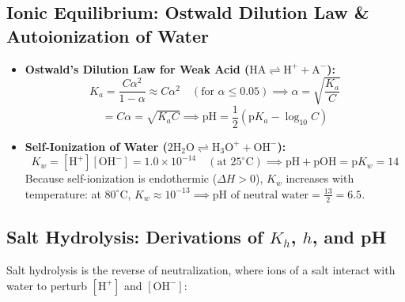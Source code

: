 \documentclass[10pt,a4paper]{article}
\begin{document}
\subsection{Ionic Equilibrium: Ostwald Dilution Law \& Autoionization of Water}
\begin{itemize}
  \item \textbf{Ostwald's Dilution Law for Weak Acid ($\mathrm{HA \rightleftharpoons H^+ + A^-}$):}
  \begin{equation}
    K_a = \frac{C\alpha^2}{1 - \alpha} \approx C\alpha^2 \quad (\text{for } \alpha \le 0.05) \implies \alpha = \sqrt{\frac{K_a}{C}}
  \end{equation}
  \begin{equation}
    [\mathrm{H}^+] = C\alpha = \sqrt{K_a C} \implies \text{pH} = \frac{1}{2}\left(\text{p}K_a - \log_{10} C\right)
  \end{equation}
  \item \textbf{Self-Ionization of Water ($\mathrm{2H_2O \rightleftharpoons H_3O^+ + OH^-}$):}
  \begin{equation}
    K_w = [\mathrm{H}^+][\mathrm{OH}^-] = 1.0 \times 10^{-14} \quad (\text{at } 25^\circ\text{C}) \implies \text{pH} + \text{pOH} = \text{p}K_w = 14
  \end{equation}
  Because self-ionization is endothermic ($\Delta H > 0$), $K_w$ increases with temperature: at $80^\circ\text{C}$, $K_w \approx 10^{-13} \implies \text{pH of neutral water} = \frac{13}{2} = 6.5$.
\end{itemize}

\subsection{Salt Hydrolysis: Derivations of $K_h$, $h$, and pH}
Salt hydrolysis is the reverse of neutralization, where ions of a salt interact with water to perturb $[\mathrm{H}^+]$ and $[\mathrm{OH}^-]$:
\end{document}
